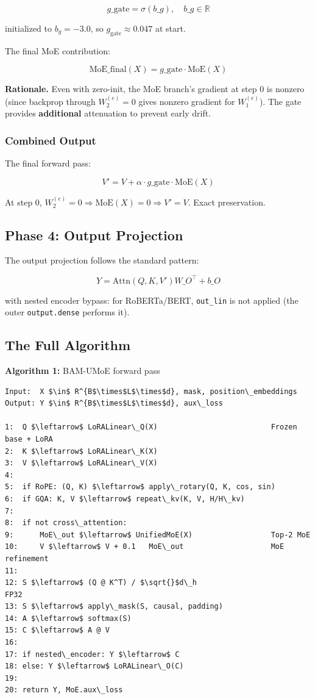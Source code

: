 \[
g\_\text{gate} = \sigma(b\_g), \quad b\_g \in \mathbb{R}
\]

initialized to $b_g = -3.0$, so $g_\text{gate} \approx 0.047$ at start.

The final MoE contribution:

\[
\text{MoE}\_\text{final}(X) = g\_\text{gate} \cdot \text{MoE}(X)
\]

\textbf{Rationale.} Even with zero-init, the MoE branch's gradient at step 0 is 
nonzero (since backprop through $W_2^{(e)} = 0$ gives nonzero gradient for 
$W_1^{(e)}$). The gate provides \textbf{additional} attenuation to prevent early 
drift.

\subsubsection{Combined Output}

The final forward pass:

\[
V' = V + \alpha \cdot g\_\text{gate} \cdot \text{MoE}(X)
\]

At step 0, $W_2^{(e)} = 0 \Rightarrow \text{MoE}(X) = 0 \Rightarrow V' = V$. 
Exact preservation.

\subsection{Phase 4: Output Projection}

The output projection follows the standard pattern:

\[
Y = \text{Attn}(Q, K, V') W\_O^\top + b\_O
\]

with nested encoder bypass: for RoBERTa/BERT, \texttt{out\_lin} is not applied 
(the outer \texttt{output.dense} performs it).

\subsection{The Full Algorithm}

\textbf{Algorithm 1:} BAM-UMoE forward pass
\begin{lstlisting}
Input:  X $\in$ R^{B$\times$L$\times$d}, mask, position\_embeddings
Output: Y $\in$ R^{B$\times$L$\times$d}, aux\_loss

1:  Q $\leftarrow$ LoRALinear\_Q(X)                          Frozen base + LoRA
2:  K $\leftarrow$ LoRALinear\_K(X)
3:  V $\leftarrow$ LoRALinear\_V(X)
4:
5:  if RoPE: (Q, K) $\leftarrow$ apply\_rotary(Q, K, cos, sin)
6:  if GQA: K, V $\leftarrow$ repeat\_kv(K, V, H/H\_kv)
7:
8:  if not cross\_attention:
9:      MoE\_out $\leftarrow$ UnifiedMoE(X)                  Top-2 MoE
10:     V $\leftarrow$ V + 0.1   MoE\_out                    MoE refinement
11:
12: S $\leftarrow$ (Q @ K^T) / $\sqrt{}$d\_h                         FP32
13: S $\leftarrow$ apply\_mask(S, causal, padding)
14: A $\leftarrow$ softmax(S)
15: C $\leftarrow$ A @ V
16:
17: if nested\_encoder: Y $\leftarrow$ C
18: else: Y $\leftarrow$ LoRALinear\_O(C)
19:
20: return Y, MoE.aux\_loss
\end{lstlisting}

